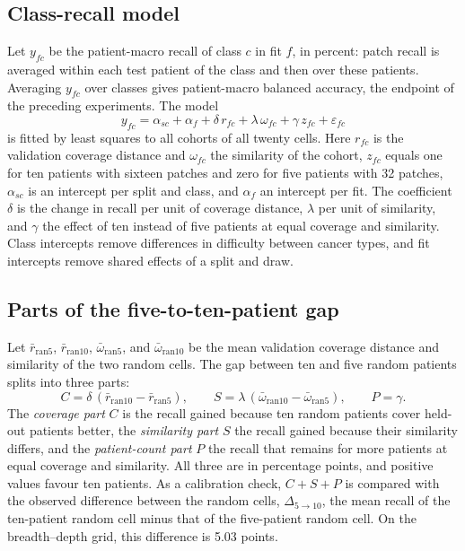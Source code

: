 \documentclass[11pt]{article}
\begin{document}
\subsection{Class-recall model}
\label{sec:model}
Let $y_{fc}$ be the patient-macro recall of class $c$ in fit $f$, in percent: patch recall is averaged within each test patient of the class and then over these patients. Averaging $y_{fc}$ over classes gives patient-macro balanced accuracy, the endpoint of the preceding experiments. The model
\begin{equation}
 y_{fc}=\alpha_{sc}+\alpha_f+\delta\,r_{fc}+\lambda\,\omega_{fc}+\gamma\,z_{fc}+\varepsilon_{fc}
 \label{eq:model}
\end{equation}
\noindent is fitted by least squares to all cohorts of all twenty cells. Here $r_{fc}$ is the validation coverage distance and $\omega_{fc}$ the similarity of the cohort, $z_{fc}$ equals one for ten patients with sixteen patches and zero for five patients with 32 patches, $\alpha_{sc}$ is an intercept per split and class, and $\alpha_f$ an intercept per fit. The coefficient $\delta$ is the change in recall per unit of coverage distance, $\lambda$ per unit of similarity, and $\gamma$ the effect of ten instead of five patients at equal coverage and similarity. Class intercepts remove differences in difficulty between cancer types, and fit intercepts remove shared effects of a split and draw.

\subsection{Parts of the five-to-ten-patient gap}
\label{sec:decomposition}
Let $\bar r_{\mathrm{ran}5}$, $\bar r_{\mathrm{ran}10}$, $\bar\omega_{\mathrm{ran}5}$, and $\bar\omega_{\mathrm{ran}10}$ be the mean validation coverage distance and similarity of the two random cells. The gap between ten and five random patients splits into three parts:
\begin{equation}
 C=\delta\,(\bar r_{\mathrm{ran}10}-\bar r_{\mathrm{ran}5}),\qquad
 S=\lambda\,(\bar\omega_{\mathrm{ran}10}-\bar\omega_{\mathrm{ran}5}),\qquad
 P=\gamma.
 \label{eq:parts}
\end{equation}
\noindent The \emph{coverage part} $C$ is the recall gained because ten random patients cover held-out patients better, the \emph{similarity part} $S$ the recall gained because their similarity differs, and the \emph{patient-count part} $P$ the recall that remains for more patients at equal coverage and similarity. All three are in percentage points, and positive values favour ten patients. As a calibration check, $C+S+P$ is compared with the observed difference between the random cells, $\Delta_{5\to10}$, the mean recall of the ten-patient random cell minus that of the five-patient random cell. On the breadth--depth grid, this difference is 5.03 points.
\end{document}
